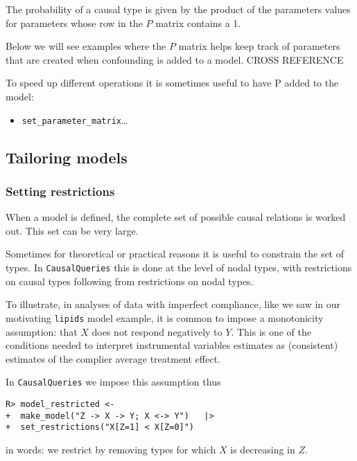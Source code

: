 \documentclass[
  11pt,
  article]{jss}
\providecommand{\tightlist}{%
  \setlength{\itemsep}{0pt}\setlength{\parskip}{0pt}}\usepackage{longtable,booktabs,array}
\begin{document}
The probability of a causal type is given by the product of the
parameters values for parameters whose row in the \(P\) matrix contains
a 1.

Below we will see examples where the \(P\) matrix helps keep track of
parameters that are created when confounding is added to a model. CROSS
REFERENCE

To speed up different operations it is sometimes useful to have P added
to the model:

\begin{itemize}
\tightlist
\item
  \texttt{set\_parameter\_matrix}\ldots{}
\end{itemize}

\hypertarget{tailoring-models}{%
\subsection{Tailoring models}\label{tailoring-models}}

\hypertarget{restrictions}{%
\subsubsection{Setting restrictions}\label{restrictions}}

When a model is defined, the complete set of possible causal relations
is worked out. This set can be very large.

Sometimes for theoretical or practical reasons it is useful to constrain
the set of types. In \texttt{CausalQueries} this is done at the level of
nodal types, with restrictions on causal types following from
restrictions on nodal types.

To illustrate, in analyses of data with imperfect compliance, like we
saw in our motivating \texttt{lipids} model example, it is common to
impose a monotonicity assumption: that \(X\) does not respond negatively
to \(Y\). This is one of the conditions needed to interpret instrumental
variables estimates as (consistent) estimates of the complier average
treatment effect.

In \texttt{CausalQueries} we impose this assumption thus

\begin{verbatim}
R> model_restricted <- 
+  make_model("Z -> X -> Y; X <-> Y")   |> 
+  set_restrictions("X[Z=1] < X[Z=0]")
\end{verbatim}

in words: we restrict by removing types for which \(X\) is decreasing in
\(Z\).
\end{document}
